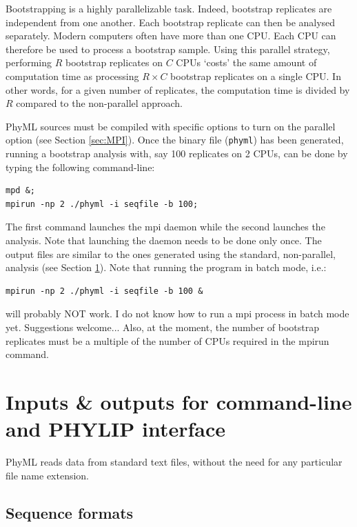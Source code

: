 \documentclass[a4paper,12pt]{article}
\newcommand{\x}[1]{\texttt{#1}}
\begin{document}
Bootstrapping is  a highly  parallelizable task. Indeed,  bootstrap replicates are  independent from
one another.   Each bootstrap replicate can then  be analysed separately. Modern  computers often have
more than one CPU. Each CPU can therefore be used to process a bootstrap sample. Using this parallel
strategy, performing  $R$ bootstrap replicates  on $C$ CPUs  `costs' the same amount  of computation
time as processing $R  \times C$ bootstrap replicates on a single CPU.  In  other words, for a given
number of replicates, the computation time is divided by $R$ compared to the non-parallel approach.

PhyML sources  must be compiled with  specific options to turn  on the parallel  option (see Section
\ref{sec:MPI}). Once  the binary file (\x{phyml})  has been generated, running  a bootstrap analysis
with, say 100 replicates on 2 CPUs, can be done by typing the following command-line:
\begin{verbatim}
mpd &;
mpirun -np 2 ./phyml -i seqfile -b 100;
\end{verbatim}
The  first command  launches  the mpi  daemon  while the  second launches  the  analysis. Note  that
launching the daemon needs to be done only once.  The output files are similar to the ones generated
using the standard, non-parallel, analysis (see Section \ref{sec:input_output}). Note that running
the program in batch mode, i.e.:
\begin{verbatim}
mpirun -np 2 ./phyml -i seqfile -b 100 &
\end{verbatim}
will probably NOT work. I do not know how to run a mpi process in batch mode yet. Suggestions welcome...
Also, at the moment, the number of bootstrap replicates must be a multiple of the number of CPUs
required in the mpirun command.

\section{Inputs \& outputs for command-line and PHYLIP interface }\label{sec:input_output}

PhyML reads data from standard text files,  without the need for any particular file name extension.

\subsection{Sequence formats}
\end{document}
